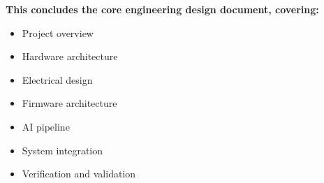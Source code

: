 \begin{validationbox}
\textbf{This concludes the core engineering design document, covering:}
\begin{itemize}
    \item Project overview
    \item Hardware architecture
    \item Electrical design
    \item Firmware architecture
    \item AI pipeline
    \item System integration
    \item Verification and validation
\end{itemize}
\end{validationbox}
